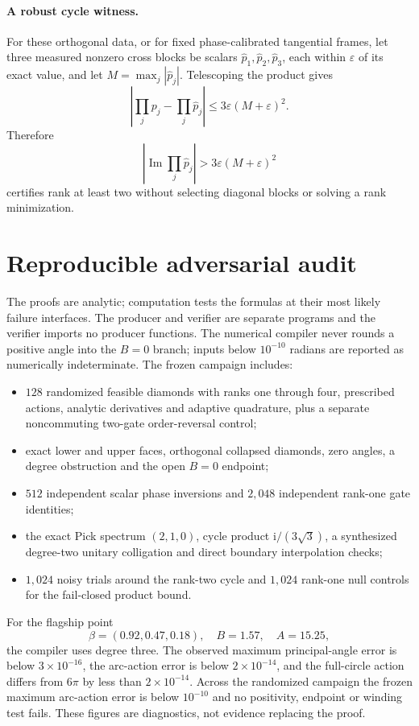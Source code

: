 \documentclass[11pt]{article}
\theoremstyle{definition}
\theoremstyle{remark}
\begin{document}
\paragraph{A robust cycle witness.}
For these orthogonal data, or for fixed phase-calibrated tangential frames,
let three measured nonzero cross blocks be scalars $\widehat p_1,
\widehat p_2,\widehat p_3$, each within $\varepsilon$ of its exact value,
and let $M=\max_j|\widehat p_j|$.  Telescoping the product gives
\[
 \left|\prod_jp_j-\prod_j\widehat p_j\right|
 \le3\varepsilon(M+\varepsilon)^2.
\]
Therefore
\[
 \left|\operatorname{Im}\prod_j\widehat p_j\right|
 >3\varepsilon(M+\varepsilon)^2
\]
certifies rank at least two without selecting diagonal blocks or solving a
rank minimization.

\section{Reproducible adversarial audit}

The proofs are analytic; computation tests the formulas at their most likely
failure interfaces.  The producer and verifier are separate programs and the
verifier imports no producer functions.  The numerical compiler never rounds
a positive angle into the $B=0$ branch; inputs below $10^{-10}$ radians are
reported as numerically indeterminate.  The frozen campaign includes:
\begin{itemize}
 \item $128$ randomized feasible diamonds with ranks one through four,
 prescribed actions, analytic derivatives and adaptive quadrature, plus a
 separate noncommuting two-gate order-reversal control;
 \item exact lower and upper faces, orthogonal collapsed diamonds, zero
 angles, a degree obstruction and the open $B=0$ endpoint;
 \item $512$ independent scalar phase inversions and $2{,}048$ independent
 rank-one gate identities;
 \item the exact Pick spectrum $(2,1,0)$, cycle product
 $\mathrm i/(3\sqrt3)$, a synthesized degree-two unitary colligation and
 direct boundary interpolation checks;
 \item $1{,}024$ noisy trials around the rank-two cycle and $1{,}024$
 rank-one null controls for the fail-closed product bound.
\end{itemize}

For the flagship point
\[
 \beta=(0.92,0.47,0.18),\quad B=1.57,\quad A=15.25,
\]
the compiler uses degree three.  The observed maximum principal-angle error
is below $3\times10^{-16}$, the arc-action error is below
$2\times10^{-14}$, and the full-circle action differs from $6\pi$ by less
than $2\times10^{-14}$.  Across the randomized campaign the frozen maximum
arc-action error is below $10^{-10}$ and no positivity, endpoint or winding
test fails.  These figures are diagnostics, not evidence replacing the
proof.
\end{document}
